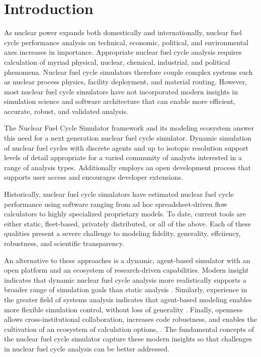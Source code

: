 
\section{Introduction}



As nuclear power expands both domestically and internationally, nuclear fuel cycle
performance analysis on technical, economic, political, and environmental axes increases 
in importance. Appropriate nuclear fuel cycle analysis requires calculation of myriad physical, nuclear, 
chemical, industrial, and political phenomena. Nuclear fuel cycle simulators 
therefore couple complex systems such as nuclear process physics, 
facility deployment, and material routing. However, most nuclear fuel cycle 
simulators have not incorporated modern insights in simulation science and 
software architecture that can enable more efficient, accurate, robust, and 
validated analysis. 

The \Cyclus Nuclear Fuel Cycle Simulator framework and 
its modeling ecosystem answer this need for a next generation nuclear fuel cycle 
simulator. Dynamic simulation of nuclear fuel cycles with discrete agents 
and up to isotopic resolution support 
levels of detail appropriate for a varied community of analysts
interested in a range of analysis types. Additionally \Cyclus employs an 
open development process that supports user access and 
encourages developer extensions.

Historically, nuclear fuel cycle simulators have estimated 
nuclear fuel cycle performance using software 
ranging from ad hoc spreadsheet-driven flow calculators to highly specialized 
proprietary models. To date, current tools are either static, fleet-based, 
privately distributed, or all of the above. Each of these qualities present a 
severe challenge to modeling fidelity, generality, effciiency, robustness, and 
scientific transparency. 

An alternative to these approaches is a dynamic, agent-based simulator with an 
open platform and an ecosystem of research-driven capabilities.  Modern 
insight indicates that dynamic nuclear fuel cycle analysis more realistically 
supports a broader range of simulation goals than static analysis 
\cite{piet_dynamic_2011}. Similarly, experience in the greater field of systems 
analysis indicates that agent-based modeling enables more flexible simulation 
control, without loss of generality \cite{thatpapermattsent}. Finally, openness 
allows cross-institutional collaboration, increases code robustness, and 
enables the cultivation of an ecosystem of calculation options, 
\cite{softwarecarpentryresource}.  The fundamental concepts of the \Cyclus 
nuclear fuel cycle simulator capture these modern insights so that challenges 
in nuclear fuel cycle analysis can be better addressed. 

